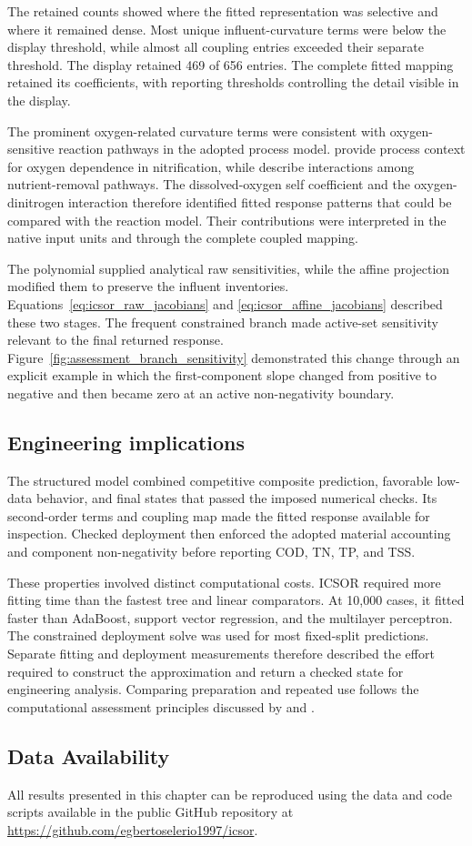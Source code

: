 The retained counts showed where the fitted representation was selective and where it remained dense. Most unique influent-curvature terms were below the display threshold, while almost all coupling entries exceeded their separate threshold. The display retained 469 of 656 entries. The complete fitted mapping retained its coefficients, with reporting thresholds controlling the detail visible in the display.

The prominent oxygen-related curvature terms were consistent with oxygen-sensitive reaction pathways in the adopted process model. \citet{StenstromSong1991} provide process context for oxygen dependence in nitrification, while \citet{Wentzel1992} describe interactions among nutrient-removal pathways. The dissolved-oxygen self coefficient and the oxygen-dinitrogen interaction therefore identified fitted response patterns that could be compared with the reaction model. Their contributions were interpreted in the native input units and through the complete coupled mapping.

The polynomial supplied analytical raw sensitivities, while the affine projection modified them to preserve the influent inventories. Equations~\eqref{eq:icsor_raw_jacobians} and \eqref{eq:icsor_affine_jacobians} described these two stages. The frequent constrained branch made active-set sensitivity relevant to the final returned response. Figure~\ref{fig:assessment_branch_sensitivity} demonstrated this change through an explicit example in which the first-component slope changed from positive to negative and then became zero at an active non-negativity boundary.

\subsection{Engineering implications}

The structured model combined competitive composite prediction, favorable low-data behavior, and final states that passed the imposed numerical checks. Its second-order terms and coupling map made the fitted response available for inspection. Checked deployment then enforced the adopted material accounting and component non-negativity before reporting COD, TN, TP, and TSS.

These properties involved distinct computational costs. ICSOR required more fitting time than the fastest tree and linear comparators. At 10,000 cases, it fitted faster than AdaBoost, support vector regression, and the multilayer perceptron. The constrained deployment solve was used for most fixed-split predictions. Separate fitting and deployment measurements therefore described the effort required to construct the approximation and return a checked state for engineering analysis. Comparing preparation and repeated use follows the computational assessment principles discussed by \citet{BhosekarIerapetritou2018} and \citet{Bliek2023}.

\subsection{Data Availability}
\label{sec:icsor_data_availability}

All results presented in this chapter can be reproduced using the data and code scripts available in the public GitHub repository at \url{https://github.com/egbertoselerio1997/icsor}.

